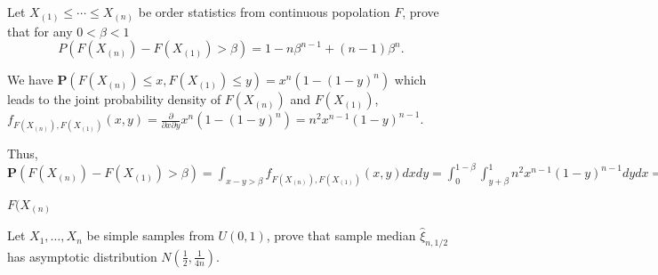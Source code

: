 \begin{problem}
    Let $ X_{(1)}\le\cdots\le X_{(n)}$ be order statistics from continuous popolation  $F$, prove that for any $0<\beta<1$
    \begin{equation*}
        P(F(X_{(n)})-F(X_{(1)})>\beta)=1-n\beta^{n-1}+(n-1)\beta^n.
    \end{equation*}
\end{problem}
\begin{solution}
    We have  $\mathbf{P} \left(F(X_{(n)}) \le x, F(X_{(1)}) \le y \right) =x^n \left(1-(1-y)^n \right)$ which leads to the joint probability density of $F(X_{(n)})$ and $F(X_{(1)})$, 
    $f_{F(X_{(n)}), F(X_{(1)})} (x,y) = \frac{\partial}{\partial x \partial y} x^n \left(1-(1-y)^n \right) = n^2 x^{n-1} (1-y)^{n-1}$. 
    
    Thus, $\mathbf{P}( F(X_{(n)})-F(X_{(1)})>\beta ) 
    = \int_{x-y>\beta} f_{F(X_{(n)}), F(X_{(1)})} (x,y) dxdy 
    = \int_0^{1-\beta} \int_{y+\beta}^1 n^2 x^{n-1} (1-y)^{n-1} dy dx 
    = \int_0^{1-\beta} (1-(y-\beta)^n) (1-y)^{n-1} dy 
    = 1-\beta^n - \int_0^{1-\beta} (y+\beta)^n (1-y)^{n-1} dy 
    = $
    
    $F(X_{(n)} $
\end{solution}




\begin{problem}
    Let $ X_1,\ldots,X_n $ be simple samples from $U(0,1)$, prove that sample median $\hat\xi_{n,1/2}$ has asymptotic distribution $N(\frac12,\frac{1}{4n})$.
\end{problem}

